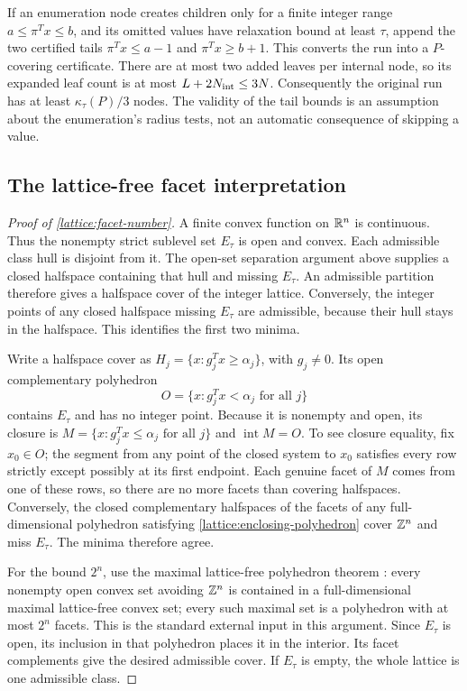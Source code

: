If an enumeration node creates children only for a finite integer range
$a\le\pi^Tx\le b$, and its omitted values have relaxation bound at least
$\tau$, append the two certified tails
$\pi^Tx\le a-1$ and $\pi^Tx\ge b+1$. This converts the run into a
$P$-covering certificate. There are at most two added leaves per internal
node, so its expanded leaf count is at most $L+2N_{\rm int}\le3N$.
Consequently the original run has at least $\kappa_\tau(P)/3$ nodes.
The validity of the tail bounds is an assumption about the enumeration's
radius tests, not an automatic consequence of skipping a value.

\subsection{The lattice-free facet interpretation}
\label{app:lattice:facets}

\begin{proof}[Proof of \cref{lattice:facet-number}]
A finite convex function on $\mathbb{R}^n$ is continuous. Thus the nonempty strict
sublevel set $E_\tau$ is open and convex. Each admissible class hull is
disjoint from it. The open-set separation argument above supplies a
closed halfspace containing that hull and missing $E_\tau$. An admissible
partition therefore gives a halfspace cover of the integer lattice.
Conversely, the integer points of any closed halfspace missing $E_\tau$
are admissible, because their hull stays in the halfspace. This identifies
the first two minima.

Write a halfspace cover as
$H_j=\{x:g_j^Tx\ge\alpha_j\}$, with $g_j\ne0$. Its open complementary
polyhedron
\begin{equation*}
 O=\{x:g_j^Tx<\alpha_j\text{ for all }j\}
\end{equation*}
contains $E_\tau$ and has no integer point. Because it is nonempty and
open, its closure is
$M=\{x:g_j^Tx\le\alpha_j\text{ for all }j\}$ and
$\operatorname{int}M=O$. To see closure equality, fix $x_0\in O$; the
segment from any point of the closed system to $x_0$ satisfies every row
strictly except possibly at its first endpoint. Each genuine facet of
$M$ comes from one of these rows, so there are no more facets than
covering halfspaces. Conversely, the closed complementary halfspaces of
the facets of any full-dimensional polyhedron satisfying
\eqref{lattice:enclosing-polyhedron} cover $\mathbb{Z}^n$ and miss $E_\tau$.
The minima therefore agree.

For the bound $2^n$, use the maximal lattice-free polyhedron theorem
\citep[Theorem~2]{basuConfortiCornuejolsZambelli2010MaximalLatticeFree}:
every nonempty open convex set avoiding $\mathbb{Z}^n$ is contained in a
full-dimensional maximal lattice-free convex set; every such maximal set
is a polyhedron with at most $2^n$ facets. This is the standard external
input in this argument. Since $E_\tau$ is open, its inclusion in that
polyhedron places it in the interior. Its facet complements give the
desired admissible cover. If $E_\tau$ is empty, the whole lattice is one
admissible class.
\end{proof}

